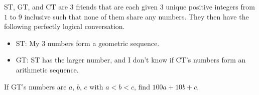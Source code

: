 ST, GT, and CT are $3$ friends that are each given $3$ unique positive integers from $1$ to $9$ inclusive such that none of them share any numbers. They then have the following perfectly logical conversation.

\begin{itemize}

\item ST: My $3$ numbers form a geometric sequence.

\item GT: ST has the larger number, and I don't know if CT's numbers form an arithmetic sequence.

\end{itemize}

If GT's numbers are $a$, $b$, $c$ with $a<b<c$, find $100a+10b+c$.
